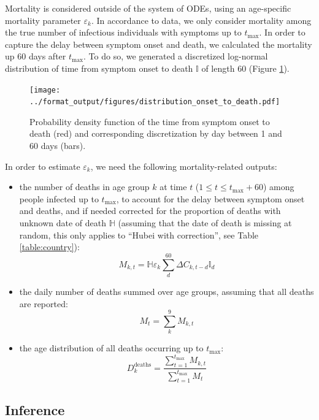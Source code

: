 \documentclass{article}
\begin{document}
Mortality is considered outside of the system of ODEs, using an age-specific mortality parameter $\varepsilon_k$.
In accordance to data, we only consider mortality among the true number of infectious individuals with symptoms up to $t_{\text{max}}$. 
In order to capture the delay between symptom onset and death, we calculated the mortality up 60 days after $t_{\text{max}}$.
To do so, we generated a discretized log-normal distribution of time from symptom onset to death $\mathds{I}$ of length 60 (Figure \ref{fig:distribution_onset_to_death}).

\begin{figure}[H]
		\centering
		\texttt{[image: ../format\_output/figures/distribution\_onset\_to\_death.pdf]}
		\caption{Probability density function of the time from symptom onset to death (red) and corresponding discretization by day between 1 and 60 days (bars).}
		\label{fig:distribution_onset_to_death}
\end{figure}

In order to estimate $\varepsilon_k$, we need the following mortality-related outputs:	
	\begin{itemize}
		\item the number of deaths in age group $k$ at time $t$ ($1\leq t \leq t_{\text{max}}+60$) among people infected up to $t_{\text{max}}$, to account for the delay between symptom onset and deaths, and if needed corrected for the proportion of deaths with unknown date of death $\mathds{H}$ (assuming that the date of death is missing at random, this only applies to ``Hubei with correction'', see Table \ref{table:country}):
		\begin{equation}
		M_{k,t}= \mathds{H}\varepsilon_k\sum_d^{60}  \Delta C_{k,t-d} \mathds{I}_d 
		\label{eq:h}
		\end{equation}
		\item the daily number of deaths summed over age groups, assuming that all deaths are reported:
		\begin{equation}
		M_{t}= \sum_k^9 M_{k,t}
		\end{equation}
		\item the age distribution of all deaths occurring up to $t_{\text{max}}$:
		\begin{equation}
		D_k^{\text{deaths}} = \frac{\sum_{t=1}^{t_{\text{max}}} M_{k,t}}{ \sum_{t=1}^{t_{\text{max}}} M_{t}}
		\end{equation}
	\end{itemize}
	
	
	\subsection{Inference}
	
\end{document}
